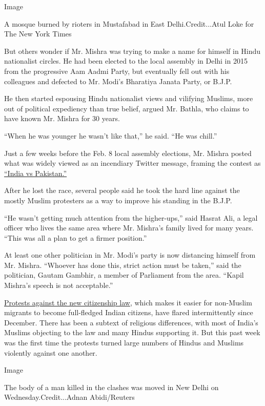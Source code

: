 Image

A mosque burned by rioters in Mustafabad in East Delhi.Credit...Atul
Loke for The New York Times

But others wonder if Mr. Mishra was trying to make a name for himself in
Hindu nationalist circles. He had been elected to the local assembly in
Delhi in 2015 from the progressive Aam Aadmi Party, but eventually fell
out with his colleagues and defected to Mr. Modi's Bharatiya Janata
Party, or B.J.P.

He then started espousing Hindu nationalist views and vilifying Muslims,
more out of political expediency than true belief, argued Mr. Bathla,
who claims to have known Mr. Mishra for 30 years.

``When he was younger he wasn't like that,'' he said. ``He was chill.''

Just a few weeks before the Feb. 8 local assembly elections, Mr. Mishra
posted what was widely viewed as an incendiary Twitter message, framing
the contest as
\href{https://twitter.com/KapilMishra_IND/status/1220213605359992833}{``India
vs Pakistan.''}

After he lost the race, several people said he took the hard line
against the mostly Muslim protesters as a way to improve his standing in
the B.J.P.

``He wasn't getting much attention from the higher-ups,'' said Hasrat
Ali, a legal officer who lives the same area where Mr. Mishra's family
lived for many years. ``This was all a plan to get a firmer position.''

At least one other politician in Mr. Modi's party is now distancing
himself from Mr. Mishra. ``Whoever has done this, strict action must be
taken,'' said the politician, Gautam Gambhir, a member of Parliament
from the area. ``Kapil Mishra's speech is not acceptable.''

\href{https://www.nytimes.com/2020/01/17/world/asia/india-protests-aishe-ghosh.html}{Protests
against the new citizenship law}, which makes it easier for non-Muslim
migrants to become full-fledged Indian citizens, have flared
intermittently since December. There has been a subtext of religious
differences, with most of India's Muslims objecting to the law and many
Hindus supporting it. But this past week was the first time the protests
turned large numbers of Hindus and Muslims violently against one
another.

Image

The body of a man killed in the clashes was moved in New Delhi on
Wednesday.Credit...Adnan Abidi/Reuters

